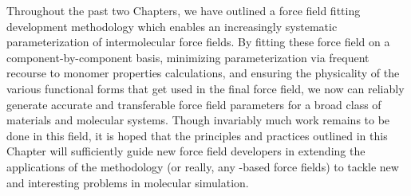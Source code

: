 Throughout the past two Chapters, we have outlined a force field fitting
development methodology which enables an increasingly systematic
parameterization of intermolecular force fields.
By fitting these force field on a component-by-component basis, 
minimizing parameterization via frequent recourse to 
monomer properties calculations, and ensuring the physicality of the various
functional forms that get used in the final force field,
we now can reliably generate accurate and
transferable force field parameters for a broad class of materials and
molecular systems. Though invariably much work remains to be done in this
field, it is hoped that the principles and practices outlined in this Chapter
will sufficiently guide new force field developers in extending the
applications of the \mastiff methodology (or really, any \eda-based force
fields) to tackle new and interesting problems in molecular simulation.
